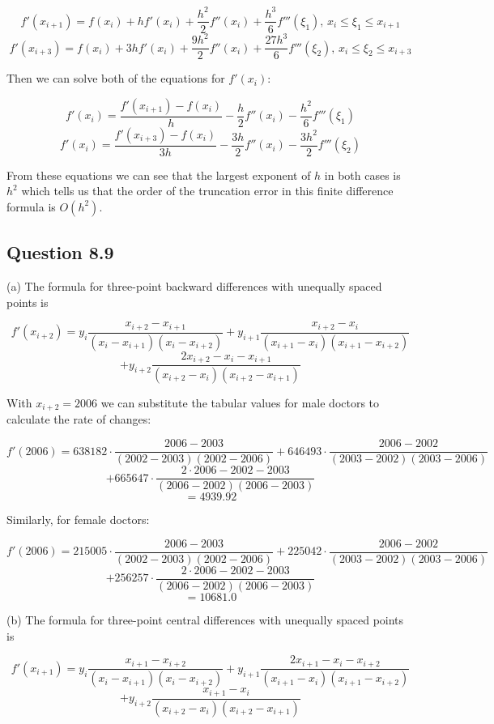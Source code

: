 \documentclass[12pt]{article}
\begin{document}
$$ f'(x_{i + 1}) = f(x_i) + h f'(x_i) + \frac{h^2}{2} f''(x_i) + \frac{h^3}{6} f'''(\xi_1),\, x_i \le \xi_1 \le x_{i + 1} $$
$$ f'(x_{i + 3}) = f(x_i) + 3h f'(x_i) + \frac{9 h^2}{2} f''(x_i) + \frac{27 h^3}{6} f'''(\xi_2),\, x_i \le \xi_2 \le x_{i + 3} $$

\indent Then we can solve both of the equations for $f'(x_i)$:

$$ f'(x_i) = \frac{f'(x_{i + 1}) - f(x_i)}{h} - \frac{h}{2} f''(x_i) - \frac{h^2}{6} f'''(\xi_1) $$
$$ f'(x_i) = \frac{f'(x_{i + 3}) - f(x_i)}{3h} - \frac{3h}{2} f''(x_i) - \frac{3 h^2}{2} f'''(\xi_2) $$

\indent From these equations we can see that the largest exponent of $h$ in both cases is $h^2$ which tells us that the order of the truncation error in this finite difference formula is $O(h^2)$.

\subsection*{Question 8.9}

\noindent (a) The formula for three-point backward differences with unequally spaced points is

$$ f'(x_{i+2}) = y_i \frac{x_{i+2} - x_{i+1}}{(x_i - x_{i+1})(x_i - x_{i+2})} + y_{i+1} \frac{x_{i+2} - x_i}{(x_{i+1} - x_i)(x_{i+1} - x_{i+2})} $$
$$ + y_{i+2} \frac{2x_{i+2} - x_i - x_{i+1}}{(x_{i+2} - x_i)(x_{i+2} - x_{i+1})} $$

\indent With $x_{i+2} = 2006$ we can substitute the tabular values for male doctors to calculate the rate of changes:

$$ f'(2006) = 638182 \cdot \frac{2006 - 2003}{(2002 - 2003)(2002 - 2006)} + 646493 \cdot \frac{2006 - 2002}{(2003 - 2002)(2003 - 2006)} $$
$$ + 665647 \cdot \frac{2\cdot2006 - 2002 - 2003}{(2006 - 2002)(2006 - 2003)} $$
$$ = 4939.92 $$

\indent Similarly, for female doctors:

$$ f'(2006) = 215005 \cdot \frac{2006 - 2003}{(2002 - 2003)(2002 - 2006)} + 225042 \cdot \frac{2006 - 2002}{(2003 - 2002)(2003 - 2006)} $$
$$ + 256257 \cdot \frac{2\cdot2006 - 2002 - 2003}{(2006 - 2002)(2006 - 2003)} $$
$$ = 10681.0 $$

\noindent (b) The formula for three-point central differences with unequally spaced points is

$$ f'(x_{i+1}) = y_i \frac{x_{i+1} - x_{i+2}}{(x_i - x_{i+1})(x_i - x_{i+2})} + y_{i+1} \frac{2x_{i+1} - x_i - x_{i+2}}{(x_{i+1} - x_i)(x_{i+1} - x_{i+2})} $$
$$ + y_{i+2} \frac{x_{i+1} - x_i}{(x_{i+2} - x_i)(x_{i+2} - x_{i+1})} $$
\end{document}
